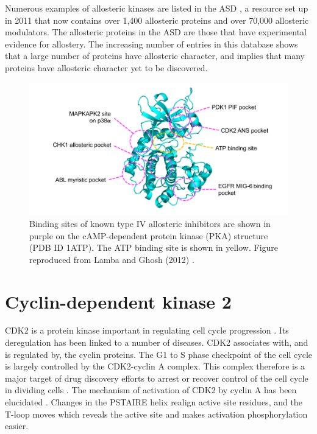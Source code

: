 Numerous examples of allosteric kinases are listed in the ASD \cite{Shen2016}, a resource set up in 2011 that now contains over 1,400 allosteric proteins and over 70,000 allosteric modulators.
The allosteric proteins in the ASD are those that have experimental evidence for allostery.
The increasing number of entries in this database shows that a large number of proteins have allosteric character, and implies that many proteins have allosteric character yet to be discovered.


\begin{figure}
\centering

\includegraphics[width=\textwidth]{figures/kinase_mods/kinase_mods}

\caption[Binding sites of known type IV allosteric inhibitors of protein kinases]
{Binding sites of known type IV allosteric inhibitors are shown in purple on the cAMP-dependent protein kinase (PKA) structure (PDB ID 1ATP).
The ATP binding site is shown in yellow.
Figure reproduced from Lamba and Ghosh (2012) \cite{Lamba2012}.}

\label{fig:kinase_mods}
\end{figure}


\section{Cyclin-dependent kinase 2}

CDK2 is a protein kinase important in regulating cell cycle progression \cite{Peyressatre2015}.
Its deregulation has been linked to a number of diseases.
CDK2 associates with, and is regulated by, the cyclin proteins.
The G1 to S phase checkpoint of the cell cycle is largely controlled by the CDK2-cyclin A complex.
This complex therefore is a major target of drug discovery efforts to arrest or recover control of the cell cycle in dividing cells \cite{Betzi2011}.
The mechanism of activation of CDK2 by cyclin A has been elucidated \cite{Jeffrey1995}.
Changes in the PSTAIRE helix realign active site residues, and the T-loop moves which reveals the active site and makes activation phosphorylation easier.


